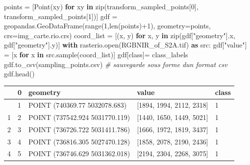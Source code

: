 \documentclass[
]{article}
\newenvironment{Shaded}{}{}
\newcommand{\BuiltInTok}[1]{\textcolor[rgb]{0.00,0.50,0.00}{#1}}
\newcommand{\CommentTok}[1]{\textcolor[rgb]{0.38,0.63,0.69}{\textit{#1}}}
\newcommand{\ControlFlowTok}[1]{\textcolor[rgb]{0.00,0.44,0.13}{\textbf{#1}}}
\newcommand{\DecValTok}[1]{\textcolor[rgb]{0.25,0.63,0.44}{#1}}
\newcommand{\ImportTok}[1]{\textcolor[rgb]{0.00,0.50,0.00}{\textbf{#1}}}
\newcommand{\KeywordTok}[1]{\textcolor[rgb]{0.00,0.44,0.13}{\textbf{#1}}}
\newcommand{\NormalTok}[1]{#1}
\newcommand{\OperatorTok}[1]{\textcolor[rgb]{0.40,0.40,0.40}{#1}}
\newcommand{\StringTok}[1]{\textcolor[rgb]{0.25,0.44,0.63}{#1}}
\begin{document}
\label{9a73f255}
\label{cb12}
\begin{Shaded}
\begin{Highlighting}[]
\NormalTok{points }\OperatorTok{=}\NormalTok{ [Point(xy) }\ControlFlowTok{for}\NormalTok{ xy }\KeywordTok{in} \BuiltInTok{zip}\NormalTok{(transform\_sampled\_points[}\DecValTok{0}\NormalTok{], transform\_sampled\_points[}\DecValTok{1}\NormalTok{])]}
\NormalTok{gdf }\OperatorTok{=}\NormalTok{ geopandas.GeoDataFrame(}\BuiltInTok{range}\NormalTok{(}\DecValTok{1}\NormalTok{,}\BuiltInTok{len}\NormalTok{(points)}\OperatorTok{+}\DecValTok{1}\NormalTok{), geometry}\OperatorTok{=}\NormalTok{points, crs}\OperatorTok{=}\NormalTok{img\_carte.rio.crs)}
\NormalTok{coord\_list }\OperatorTok{=}\NormalTok{ [(x, y) }\ControlFlowTok{for}\NormalTok{ x, y }\KeywordTok{in} \BuiltInTok{zip}\NormalTok{(gdf[}\StringTok{"geometry"}\NormalTok{].x, gdf[}\StringTok{"geometry"}\NormalTok{].y)]}
\ControlFlowTok{with}\NormalTok{ rasterio.}\BuiltInTok{open}\NormalTok{(}\StringTok{\textquotesingle{}RGBNIR\_of\_S2A.tif\textquotesingle{}}\NormalTok{) }\ImportTok{as}\NormalTok{ src:}
\NormalTok{  gdf[}\StringTok{"value"}\NormalTok{] }\OperatorTok{=}\NormalTok{ [x }\ControlFlowTok{for}\NormalTok{ x }\KeywordTok{in}\NormalTok{ src.sample(coord\_list)]}
\NormalTok{gdf[}\StringTok{\textquotesingle{}class\textquotesingle{}}\NormalTok{]}\OperatorTok{=}\NormalTok{ class\_labels}
\NormalTok{gdf.to\_csv(}\StringTok{\textquotesingle{}sampling\_points.csv\textquotesingle{}}\NormalTok{) }\CommentTok{\# sauvegarde sous forme d\textquotesingle{}un format csv}
\NormalTok{gdf.head()}
\end{Highlighting}
\end{Shaded}

\begin{longtable}[]{@{}lllll@{}}
\toprule\noalign{}
& 0 & geometry & value & class \\
\midrule\noalign{}
\endhead
\bottomrule\noalign{}
\endlastfoot
0 & 1 & POINT (740369.77 5032078.683) & {[}1894, 1994, 2112, 2318{]} &
1 \\
1 & 2 & POINT (737542.924 5031770.119) & {[}1440, 1650, 1449, 5021{]} &
1 \\
2 & 3 & POINT (736726.722 5031411.786) & {[}1666, 1972, 1819, 3437{]} &
1 \\
3 & 4 & POINT (736816.305 5027470.128) & {[}1858, 2078, 2190, 2436{]} &
1 \\
4 & 5 & POINT (736746.629 5031362.018) & {[}2194, 2304, 2268, 3075{]} &
1 \\
\end{longtable}
\end{document}
